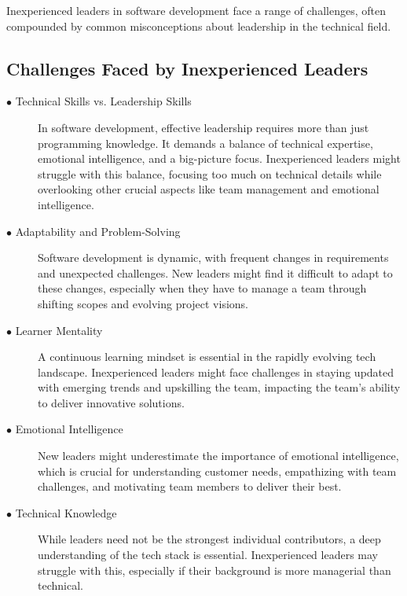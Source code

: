 \documentclass[runningheads]{llncs}
\begin{document}
 Inexperienced leaders in software development face a range of challenges, often compounded by common misconceptions about leadership in the technical field.

\subsection{Challenges Faced by Inexperienced Leaders}

\begin{description}
  \item [$\bullet$ Technical Skills vs. Leadership Skills] In software development, effective leadership requires more than just programming knowledge. It demands a balance of technical expertise, emotional intelligence, and a big-picture focus. Inexperienced leaders might struggle with this balance, focusing too much on technical details while overlooking other crucial aspects like team management and emotional intelligence. \cite{ref_1}\cite{ref_15}
  \\
  
  \item [$\bullet$ Adaptability and Problem-Solving] Software development is dynamic, with frequent changes in requirements and unexpected challenges. New leaders might find it difficult to adapt to these changes, especially when they have to manage a team through shifting scopes and evolving project visions. \cite{ref_2}\cite{ref_12}
  \\

  \item [$\bullet$ Learner Mentality] A continuous learning mindset is essential in the rapidly evolving tech landscape. Inexperienced leaders might face challenges in staying updated with emerging trends and upskilling the team, impacting the team's ability to deliver innovative solutions. \cite{ref_3}
  \\
  
  \item [$\bullet$ Emotional Intelligence] New leaders might underestimate the importance of emotional intelligence, which is crucial for understanding customer needs, empathizing with team challenges, and motivating team members to deliver their best. \cite{ref_4}
  \\
  
  \item [$\bullet$ Technical Knowledge] While leaders need not be the strongest individual contributors, a deep understanding of the tech stack is essential. Inexperienced leaders may struggle with this, especially if their background is more managerial than technical. \cite{ref_6}
  \\
  
\end{description}
\end{document}
